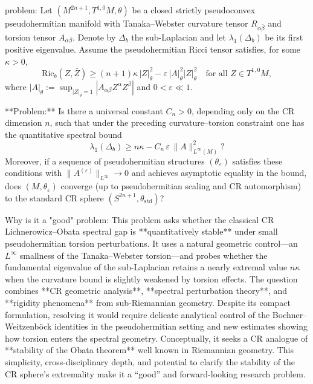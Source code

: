 problem:  
Let \((M^{2n+1}, T^{1,0}M, \theta)\) be a closed strictly pseudoconvex pseudohermitian manifold with Tanaka–Webster curvature tensor \(R_{\alpha\bar\beta}\) and torsion tensor \(A_{\alpha\beta}\). Denote by \(\Delta_b\) the sub-Laplacian and let \(\lambda_1(\Delta_b)\) be its first positive eigenvalue. Assume the pseudohermitian Ricci tensor satisfies, for some \(\kappa>0\),  
\[
\mathrm{Ric}_b(Z,\bar Z) \ge (n+1)\kappa\,|Z|_\theta^2 - \varepsilon\,|A|_\theta^2 |Z|_\theta^2
\quad \text{for all } Z\in T^{1,0}M,
\]
where \(|A|_\theta := \sup_{|Z|_\theta=1}|A_{\alpha\beta}Z^\alpha Z^\beta|\) and \(0 < \varepsilon \ll 1\).  

**Problem:**  
Is there a universal constant \(C_n>0\), depending only on the CR dimension \(n\), such that under the preceding curvature–torsion constraint one has the quantitative spectral bound  
\[
\lambda_1(\Delta_b) \ge n\kappa - C_n\,\varepsilon\,\|A\|_{L^\infty(M)}^2?
\]
Moreover, if a sequence of pseudohermitian structures \((\theta_\varepsilon)\) satisfies these conditions with \(\|A^{(\varepsilon)}\|_{L^\infty}\to 0\) and achieves asymptotic equality in the bound, does \((M, \theta_\varepsilon)\) converge (up to pseudohermitian scaling and CR automorphism) to the standard CR sphere \((S^{2n+1}, \theta_{\mathrm{std}})\)?  

Why is it a "good" problem:  
This problem asks whether the classical CR Lichnerowicz–Obata spectral gap is **quantitatively stable** under small pseudohermitian torsion perturbations. It uses a natural geometric control—an \(L^{\infty}\) smallness of the Tanaka–Webster torsion—and probes whether the fundamental eigenvalue of the sub-Laplacian retains a nearly extremal value \(n\kappa\) when the curvature bound is slightly weakened by torsion effects. The question combines **CR geometric analysis**, **spectral perturbation theory**, and **rigidity phenomena** from sub-Riemannian geometry. Despite its compact formulation, resolving it would require delicate analytical control of the Bochner–Weitzenböck identities in the pseudohermitian setting and new estimates showing how torsion enters the spectral geometry. Conceptually, it seeks a CR analogue of **stability of the Obata theorem** well known in Riemannian geometry. This simplicity, cross-disciplinary depth, and potential to clarify the stability of the CR sphere’s extremality make it a “good” and forward-looking research problem.